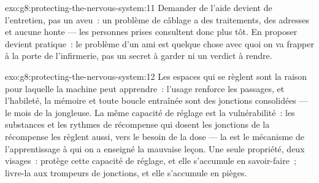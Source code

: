 \begin{solution}{exo:g8:protecting-the-nervous-system:11}
Demander de l'aide devient de l'entretien, pas un aveu~: un
problème de câblage a des traitements, des adresses et
aucune honte --- les personnes prises consultent donc plus
tôt. En proposer devient pratique~: le problème d'un ami
est quelque chose avec quoi on va frapper à la porte de
l'infirmerie, pas un secret à garder ni un verdict à rendre.
\end{solution}

\begin{solution}{exo:g8:protecting-the-nervous-system:12}
Les espaces qui se règlent sont la raison pour laquelle la
machine peut apprendre~: l'usage renforce les passages, et
l'habileté, la mémoire et toute boucle entraînée sont des
jonctions consolidées --- le mois de la jongleuse. La même
capacité de réglage est la vulnérabilité~: les substances
et les rythmes de récompense qui dosent les jonctions de la
récompense les règlent aussi, vers le besoin de la dose ---
la  est le mécanisme de l'apprentissage à qui on
a enseigné la mauvaise leçon. Une seule propriété, deux
visages~: protège cette capacité de réglage, et elle
s'accumule en savoir-faire~; livre-la aux trompeurs de
jonctions, et elle s'accumule en pièges.
\end{solution}

